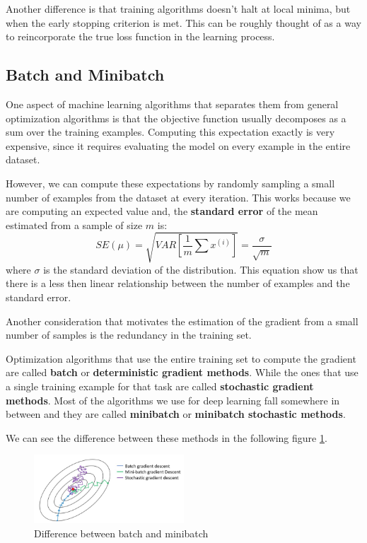Another difference is that training algorithms doesn't halt at local minima, but
when the early stopping criterion is met. This can be roughly thought of as a
way to reincorporate the true loss function in the learning process.
\subsection{Batch and Minibatch}
One aspect of machine learning algorithms that separates them from general
optimization algorithms is that the objective function usually decomposes as a
sum over the training examples. Computing this expectation exactly is very
expensive, since it requires evaluating the model on every example in the entire
dataset.

However, we can compute these expectations by randomly sampling a small number
of examples from the dataset at every iteration. This works because we are
computing an expected value and, the \textbf{standard error} of the mean estimated
from a sample of size $m$ is:
\begin{equation}
    SE(\mu) = \sqrt{VAR\left[\frac{1}{m}\sum x^{(i)}\right]} = \frac{\sigma}{\sqrt{m}}
\end{equation}
where $\sigma$ is the standard deviation of the distribution. This equation show
us that there is a less then linear relationship between the number of examples
and the standard error.

Another consideration that motivates the estimation of the gradient from a
small number of samples is the redundancy in the training set.

Optimization algorithms that use the entire training set to compute the gradient
are called \textbf{batch} or \textbf{deterministic gradient methods}. While the
ones that use a single training example for that task are called \textbf{stochastic
    gradient methods}. Most of the algorithms we use for deep learning fall
somewhere in between and they are called \textbf{minibatch} or \textbf{minibatch
    stochastic methods}.

We can see the difference between these methods in the following figure \ref{fig:batchminibatch}.
\begin{figure}[!ht]
    \centering
    \includegraphics[width=0.5\textwidth]{img/minibatchvsbatch.png}
    \caption{Difference between batch and minibatch}
    \label{fig:batchminibatch}
\end{figure}

